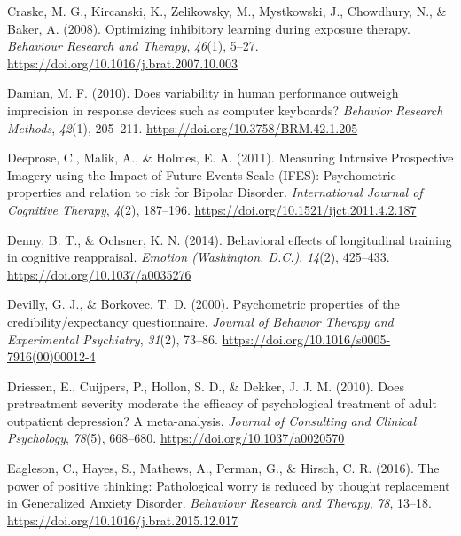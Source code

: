 \documentclass[
  man,floatsintext]{apa7}
\newlength{\cslhangindent}
\newlength{\cslentryspacingunit} %
\newenvironment{CSLReferences}[2] %
 {%
  \setlength{\parindent}{0pt}
  \ifodd #1
  \let\oldpar\par
  \def\par{\hangindent=\cslhangindent\oldpar}
  \fi
  \setlength{\parskip}{#2\cslentryspacingunit}
 }%
 {}
\begin{document}
\begin{CSLReferences}{1}{0}
\leavevmode{}%
Craske, M. G., Kircanski, K., Zelikowsky, M., Mystkowski, J., Chowdhury, N., \& Baker, A. (2008). Optimizing inhibitory learning during exposure therapy. \emph{Behaviour Research and Therapy}, \emph{46}(1), 5--27. \url{https://doi.org/10.1016/j.brat.2007.10.003}

\leavevmode{}%
Damian, M. F. (2010). Does variability in human performance outweigh imprecision in response devices such as computer keyboards? \emph{Behavior Research Methods}, \emph{42}(1), 205--211. \url{https://doi.org/10.3758/BRM.42.1.205}

\leavevmode{}%
Deeprose, C., Malik, A., \& Holmes, E. A. (2011). Measuring Intrusive Prospective Imagery using the Impact of Future Events Scale (IFES): Psychometric properties and relation to risk for Bipolar Disorder. \emph{International Journal of Cognitive Therapy}, \emph{4}(2), 187--196. \url{https://doi.org/10.1521/ijct.2011.4.2.187}

\leavevmode{}%
Denny, B. T., \& Ochsner, K. N. (2014). Behavioral effects of longitudinal training in cognitive reappraisal. \emph{Emotion (Washington, D.C.)}, \emph{14}(2), 425--433. \url{https://doi.org/10.1037/a0035276}

\leavevmode{}%
Devilly, G. J., \& Borkovec, T. D. (2000). Psychometric properties of the credibility/expectancy questionnaire. \emph{Journal of Behavior Therapy and Experimental Psychiatry}, \emph{31}(2), 73--86. \url{https://doi.org/10.1016/s0005-7916(00)00012-4}

\leavevmode{}%
Driessen, E., Cuijpers, P., Hollon, S. D., \& Dekker, J. J. M. (2010). Does pretreatment severity moderate the efficacy of psychological treatment of adult outpatient depression? A meta-analysis. \emph{Journal of Consulting and Clinical Psychology}, \emph{78}(5), 668--680. \url{https://doi.org/10.1037/a0020570}

\leavevmode{}%
Eagleson, C., Hayes, S., Mathews, A., Perman, G., \& Hirsch, C. R. (2016). The power of positive thinking: Pathological worry is reduced by thought replacement in Generalized Anxiety Disorder. \emph{Behaviour Research and Therapy}, \emph{78}, 13--18. \url{https://doi.org/10.1016/j.brat.2015.12.017}


\end{CSLReferences}
\end{document}
